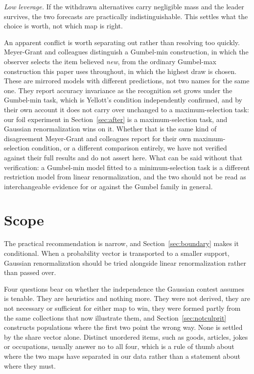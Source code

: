 \documentclass[11pt]{article}
\begin{document}
\emph{Low leverage.} If the withdrawn alternatives carry negligible mass and the leader survives,
the two forecasts are practically indistinguishable. This settles what the choice is worth, not
which map is right.

An apparent conflict is worth separating out rather than resolving too quickly. Meyer-Grant
and colleagues \cite{meyergrant2026} distinguish a Gumbel-min construction, in which the
observer selects the item believed \emph{new}, from the ordinary Gumbel-max construction this
paper uses throughout, in which the highest draw is chosen. These are mirrored models with
different predictions, not two names for the same one. They report accuracy invariance as the
recognition set grows under the Gumbel-min task, which is Yellott's condition independently
confirmed, and by their own account it does not carry over unchanged to a maximum-selection
task: our foil experiment in Section~\ref{sec:after} is a maximum-selection task, and Gaussian
renormalization wins on it. Whether that is the same kind of disagreement Meyer-Grant and
colleagues report for their own maximum-selection condition, or a different comparison
entirely, we have not verified against their full results and do not assert here. What can be
said without that verification: a Gumbel-min model fitted to a minimum-selection task is a
different restriction model from linear renormalization, and the two should not be read as
interchangeable evidence for or against the Gumbel family in general.


\section{Scope}
\label{sec:scope}

The practical recommendation is narrow, and Section~\ref{sec:boundary} makes it conditional.
When a probability vector is transported to a smaller support, Gaussian renormalization should be
tried alongside linear renormalization rather than passed over.

Four questions bear on whether the independence the Gaussian contest assumes is tenable. They are
heuristics and nothing more. They were not derived, they are not necessary or sufficient for
either map to win, they were formed partly from the same collections that now illustrate them,
and Section~\ref{sec:notculprit} constructs populations where the first two point the wrong way.
None is settled by the share vector alone. Distinct unordered items, such as goods, articles,
jokes or occupations, usually answer no to all four, which is a rule of thumb about where the two
maps have separated in our data rather than a statement about where they must.
\end{document}
